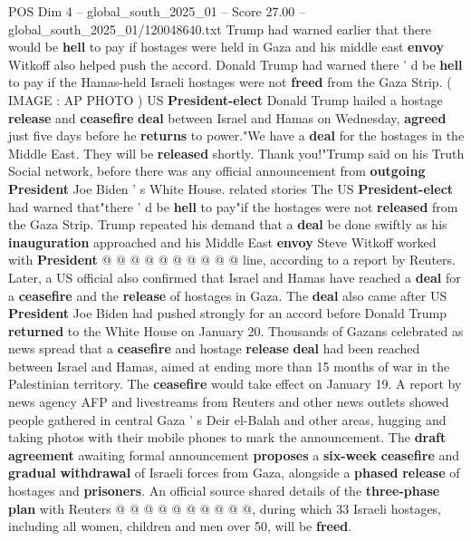 \begin{textsample}{POS Dim 4 – global\_south\_2025\_01 – Score 27.00 – global\_south\_2025\_01/120048640.txt}  \label{ex:f4_pos_008}
Trump had warned earlier that there would be \textbf{hell} to pay if hostages were held in Gaza and his middle east \textbf{envoy} Witkoff also helped push the accord.
Donald Trump had warned there ' d be \textbf{hell} to pay if the Hamas-held Israeli hostages were not \textbf{freed} from the Gaza Strip. ( IMAGE : AP PHOTO ) US \textbf{President-elect} Donald Trump hailed a hostage \textbf{release} and \textbf{ceasefire} \textbf{deal} between Israel and Hamas on Wednesday, \textbf{agreed} just five days before he \textbf{returns} to power."We have a \textbf{deal} for the hostages in the Middle East.
They will be \textbf{released} shortly.
Thank you!"Trump said on his Truth Social network, before there was any official announcement from \textbf{outgoing} \textbf{President} Joe Biden ' s White House. related stories The US \textbf{President-elect} had warned that"there ' d be \textbf{hell} to pay"if the hostages were not \textbf{released} from the Gaza Strip.
Trump repeated his demand that a \textbf{deal} be done swiftly as his \textbf{inauguration} approached and his Middle East \textbf{envoy} Steve Witkoff worked with \textbf{President} @ @ @ @ @ @ @ @ @ @ line, according to a report by Reuters.
Later, a US official also confirmed that Israel and Hamas have reached a \textbf{deal} for a \textbf{ceasefire} and the \textbf{release} of hostages in Gaza.
The \textbf{deal} also came after US \textbf{President} Joe Biden had pushed strongly for an accord before Donald Trump \textbf{returned} to the White House on January 20.
Thousands of Gazans celebrated as news spread that a \textbf{ceasefire} and hostage \textbf{release} \textbf{deal} had been reached between Israel and Hamas, aimed at ending more than 15 months of war in the Palestinian territory.
The \textbf{ceasefire} would take effect on January 19.
A report by news agency AFP and livestreams from Reuters and other news outlets showed people gathered in central Gaza ' s Deir el-Balah and other areas, hugging and taking photos with their mobile phones to mark the announcement.
The \textbf{draft} \textbf{agreement} awaiting formal announcement \textbf{proposes} a \textbf{six-week} \textbf{ceasefire} and \textbf{gradual} \textbf{withdrawal} of Israeli forces from Gaza, alongside a \textbf{phased} \textbf{release} of hostages and \textbf{prisoners}.
An official source shared details of the \textbf{three-phase} \textbf{plan} with Reuters @ @ @ @ @ @ @ @ @ @, during which 33 Israeli hostages, including all women, children and men over 50, will be \textbf{freed}.

\end{textsample}
